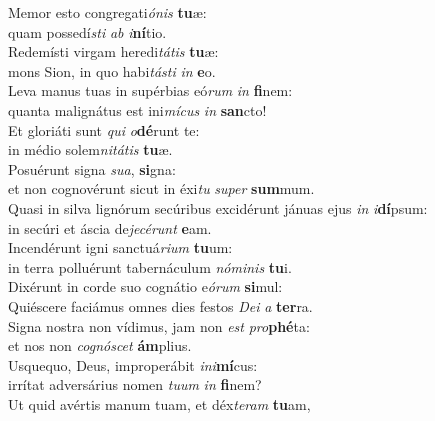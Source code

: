 \evenverse Memor esto congregati\textit{ó}\textit{nis} \textbf{tu}æ:~\*\\
\evenverse quam possedí\textit{sti} \textit{ab} \textit{i}\textbf{ní}tio.\\
\oddverse Redemísti virgam heredi\textit{tá}\textit{tis} \textbf{tu}æ:~\*\\
\oddverse mons Sion, in quo habi\textit{tá}\textit{sti} \textit{in} \textbf{e}o.\\
\evenverse Leva manus tuas in supérbias eó\textit{rum} \textit{in} \textbf{fi}nem:~\*\\
\evenverse quanta malignátus est ini\textit{mí}\textit{cus} \textit{in} \textbf{san}cto!\\
\oddverse Et gloriáti sunt \textit{qui} \textit{o}\textbf{dé}runt te:~\*\\
\oddverse in médio solem\textit{ni}\textit{tá}\textit{tis} \textbf{tu}æ.\\
\evenverse Posuérunt signa \textit{su}\textit{a}, \textbf{si}gna:~\*\\
\evenverse et non cognovérunt sicut in éxi\textit{tu} \textit{su}\textit{per} \textbf{sum}mum.\\
\oddverse Quasi in silva lignórum secúribus excidérunt jánuas ejus \textit{in} \textit{i}\textbf{dí}psum:~\*\\
\oddverse in secúri et áscia de\textit{je}\textit{cé}\textit{runt} \textbf{e}am.\\
\evenverse Incendérunt igni sanctuá\textit{ri}\textit{um} \textbf{tu}um:~\*\\
\evenverse in terra polluérunt tabernáculum \textit{nó}\textit{mi}\textit{nis} \textbf{tu}i.\\
\oddverse Dixérunt in corde suo cognátio e\textit{ó}\textit{rum} \textbf{si}mul:~\*\\
\oddverse Quiéscere faciámus omnes dies festos \textit{De}\textit{i} \textit{a} \textbf{ter}ra.\\
\evenverse Signa nostra non vídimus, jam non \textit{est} \textit{pro}\textbf{phé}ta:~\*\\
\evenverse et nos non \textit{co}\textit{gnó}\textit{scet} \textbf{ám}plius.\\
\oddverse Usquequo, Deus, improperábit \textit{i}\textit{ni}\textbf{mí}cus:~\*\\
\oddverse irrítat adversárius nomen \textit{tu}\textit{um} \textit{in} \textbf{fi}nem?\\
\evenverse Ut quid avértis manum tuam, et déx\textit{te}\textit{ram} \textbf{tu}am,~\*\\
